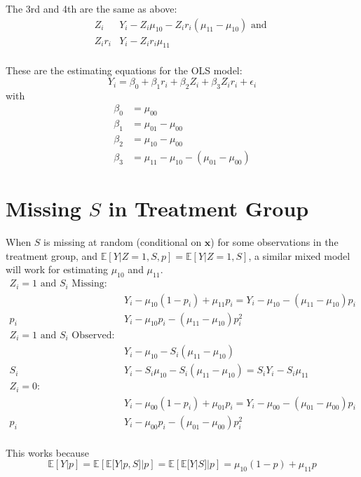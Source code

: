 \documentclass[11pt]{article} %
\begin{document}
The 3rd and 4th are the same as above:
\begin{align*}
  Z_i&Y_i-Z_i\mu_{10}-Z_ir_i(\mu_{11}-\mu_{10})\text{ and }\\
  Z_ir_i&Y_i-Z_ir_i\mu_{11}\\
\end{align*}

These are the estimating equations for the OLS model:
\begin{equation}\label{eq:regression0}
  Y_i=\beta_0+\beta_1r_i+\beta_2Z_i+\beta_3Z_ir_i+\epsilon_i
\end{equation}
with
\begin{align*}
  \beta_0&=\mu_{00}\\
  \beta_1&=\mu_{01}-\mu_{00}\\
  \beta_2&=\mu_{10}-\mu_{00}\\
  \beta_3&=\mu_{11}-\mu_{10}-(\mu_{01}-\mu_{00})
\end{align*}

\section{Missing $S$ in Treatment Group}
When $S$ is missing at random (conditional on $\bm{x}$) for some observations in the treatment group,
and $\mathbb{E}[Y|Z=1,S,p]=\mathbb{E}[Y|Z=1,S]$,
a similar mixed model will work for estimating $\mu_{10}$ and $\mu_{11}$.
\begin{align*}
  Z_i=1\text{ and }S_i\text{ Missing}:&\\
  &Y_i-\mu_{10}(1-p_i)+\mu_{11}p_i=Y_i-\mu_{10}-(\mu_{11}-\mu_{10})p_i\\
  p_i&Y_i-\mu_{10}p_i-(\mu_{11}-\mu_{10})p_i^2\\
  Z_i=1\text{ and }S_i\text{ Observed}:&\\
        &Y_i-\mu_{10}-S_i(\mu_{11}-\mu_{10})\\
  S_i&Y_i-S_i\mu_{10}-S_i(\mu_{11}-\mu_{10})=S_iY_i-S_i\mu_{11}\\
    Z_i=0:&\\
  &Y_i-\mu_{00}(1-p_i)+\mu_{01}p_i=Y_i-\mu_{00}-(\mu_{01}-\mu_{00})p_i\\
  p_i&Y_i-\mu_{00}p_i-(\mu_{01}-\mu_{00})p_i^2\\
\end{align*}

This works because
\begin{equation*}
  \mathbb{E}[Y|p]=\mathbb{E}\left[\mathbb{E}[Y|p,S]|p\right]=\mathbb{E}\left[\mathbb{E}[Y|S]|p\right]=\mu_{10}(1-p)+\mu_{11}p
\end{equation*}
\end{document}
